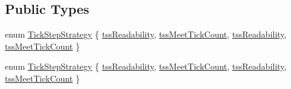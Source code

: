 \subsection*{Public Types}
\begin{DoxyCompactItemize}
\item 
enum \hyperlink{class_q_c_p_axis_ticker_ab6d2f9d9477821623ac9bc4b21ddf49a}{Tick\+Step\+Strategy} \{ \hyperlink{class_q_c_p_axis_ticker_ab6d2f9d9477821623ac9bc4b21ddf49aa58661394415760a6eb2fd2f1e6604f40}{tss\+Readability}, 
\hyperlink{class_q_c_p_axis_ticker_ab6d2f9d9477821623ac9bc4b21ddf49aa00554450d75d9741f6312a161c49a31f}{tss\+Meet\+Tick\+Count}, 
\hyperlink{class_q_c_p_axis_ticker_ab6d2f9d9477821623ac9bc4b21ddf49aa58661394415760a6eb2fd2f1e6604f40}{tss\+Readability}, 
\hyperlink{class_q_c_p_axis_ticker_ab6d2f9d9477821623ac9bc4b21ddf49aa00554450d75d9741f6312a161c49a31f}{tss\+Meet\+Tick\+Count}
 \}
\item 
enum \hyperlink{class_q_c_p_axis_ticker_ab6d2f9d9477821623ac9bc4b21ddf49a}{Tick\+Step\+Strategy} \{ \hyperlink{class_q_c_p_axis_ticker_ab6d2f9d9477821623ac9bc4b21ddf49aa58661394415760a6eb2fd2f1e6604f40}{tss\+Readability}, 
\hyperlink{class_q_c_p_axis_ticker_ab6d2f9d9477821623ac9bc4b21ddf49aa00554450d75d9741f6312a161c49a31f}{tss\+Meet\+Tick\+Count}, 
\hyperlink{class_q_c_p_axis_ticker_ab6d2f9d9477821623ac9bc4b21ddf49aa58661394415760a6eb2fd2f1e6604f40}{tss\+Readability}, 
\hyperlink{class_q_c_p_axis_ticker_ab6d2f9d9477821623ac9bc4b21ddf49aa00554450d75d9741f6312a161c49a31f}{tss\+Meet\+Tick\+Count}
 \}
\end{DoxyCompactItemize}
